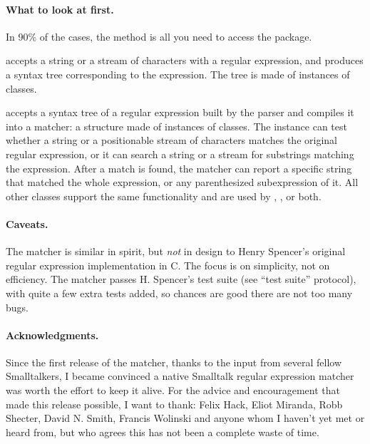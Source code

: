 \documentclass[a4paper,10pt,twoside]{book}
\begin{document}
{\paragraph{What to look at first.}
In 90\% of the cases, the method   is all you need to access the package.

 accepts a string or a stream of characters with a regular expression, and produces a syntax tree corresponding to the expression. The tree is made of instances of  classes.

  accepts a syntax tree of a regular expression built by the parser and compiles it into a matcher: a structure made of instances of  classes. The  instance can test whether a string or a positionable stream of characters matches the original regular expression, or it can search a string or a stream for substrings matching the expression. After a match is found, the matcher can report a specific string that matched the whole expression, or any parenthesized subexpression of it. All other classes support the same functionality and are used by , , or both.

\paragraph{Caveats.} The matcher is similar in spirit, but \emph{not} in design
to Henry Spencer's original regular expression implementation in C.  The focus is on simplicity, not on efficiency.%
The matcher passes H. Spencer's test suite (see ``test suite'' protocol), with quite a few extra tests added, so chances are good there are not too many bugs.

\paragraph{Acknowledgments.}
Since the first release of the matcher, thanks to the input from several fellow Smalltalkers, I became convinced a native Smalltalk regular expression matcher was worth the effort to keep it alive. For the advice and encouragement that made this release possible, I want to thank: Felix Hack, Eliot Miranda, Robb Shecter, David N. Smith, Francis Wolinski and anyone whom I haven't yet met or heard from, but who agrees this has not been a complete waste of time.

}
\end{document}
